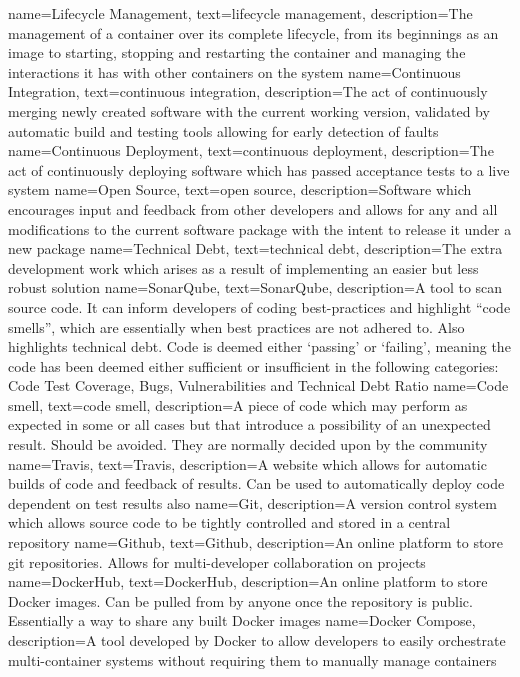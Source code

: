 {
		name={Lifecycle Management},
    text={lifecycle management},
		description={The management of a container over its complete lifecycle, from its beginnings as an image to starting, stopping and restarting the container and managing the interactions it has with other containers on the system}
}
{
		name={Continuous Integration},
    text={continuous integration},
		description={The act of continuously merging newly created software with the current working version, validated by automatic build and testing tools allowing for early detection of faults}
}
{
		name={Continuous Deployment},
		text={continuous deployment},
		description={The act of continuously deploying software which has passed acceptance tests to a live system}
}
{
    name={Open Source},
    text={open source},
    description={Software which encourages input and feedback from other developers and allows for any and all modifications to the current software package with the intent to release it under a new package}
}
{
    name={Technical Debt},
    text={technical debt},
    description={The extra development work which arises as a result of implementing an easier but less robust solution}
}
{
    name={SonarQube},
    text={SonarQube},
    description={A tool to scan source code. It can inform developers of coding best-practices and highlight ``code smells'', which are essentially when best practices are not adhered to. Also highlights technical debt. Code is deemed either `passing' or `failing', meaning the code has been deemed either sufficient or insufficient in the following categories: Code Test Coverage, Bugs, Vulnerabilities and Technical Debt Ratio}
}
{
    name={Code smell},
    text={code smell},
    description={A piece of code which may perform as expected in some or all cases but that introduce a possibility of an unexpected result. Should be avoided. They are normally decided upon by the community}
}
{
    name={Travis},
    text={Travis},
    description={A website which allows for automatic builds of code and feedback of results. Can be used to automatically deploy code dependent on test results also}
}
{
    name={Git},
    description={A version control system which allows source code to be tightly controlled and stored in a central repository}
}
{
    name={Github},
    text={Github},
    description={An online platform to store git repositories. Allows for multi-developer collaboration on projects}
}
{
    name={DockerHub},
    text={DockerHub},
    description={An online platform to store Docker images. Can be pulled from by anyone once the repository is public. Essentially a way to share any built Docker images}
}
{
    name={Docker Compose},
    description={A tool developed by Docker to allow developers to easily orchestrate multi-container systems without requiring them to manually manage containers}
}
